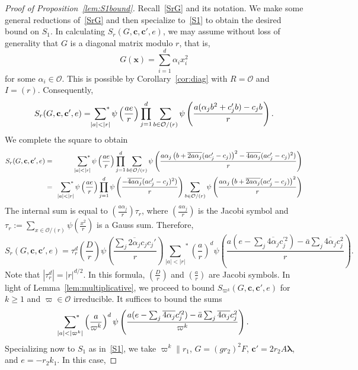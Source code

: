 \documentclass[10pt]{amsart}
\theoremstyle{plain}
\theoremstyle{plain}
\renewcommand{\vec}[1]{\mathbf{#1}}
\theoremstyle{remark}
\theoremstyle{definition}
\newcommand{\sumstar}{\sideset{}{^*}\sum}
\begin{document}
\begin{proof}[Proof of Proposition~\ref{lem:S1bound}]
Recall~\eqref{SrG} and its notation. We make some general reductions of~\eqref{SrG} and then specialize to~\eqref{S1} to obtain the desired bound on $S_1$. In calculating $S_r(G,\vec{c},\vec{c}',e)$, we may assume without loss of generality that $G$ is a diagonal matrix modulo $r$, that is,
\[G(\vec{x})=\sum_{i=1}^d\alpha_ix_i^2\]
for some $\alpha_i\in\mathcal{O}$. This is possible by Corollary~\ref{cor:diag} with $R=\mathcal{O}$ and $I=(r)$. Consequently,
\[S_r(G,\vec{c},\vec{c}',e)=\sumstar_{|a|<|r|} \psi\left(\frac{ae}{r}\right)  \prod_{j=1}^{d} \sum_{b\in\mathcal{O}/(r)} \psi\left(\frac{a(\alpha_jb^2+c_j^{\prime}b)-c_jb}{r} \right).\]
We complete the square to obtain
\begin{eqnarray*}S_r(G,\vec{c},\vec{c}',e)&=&\sumstar_{|a|<|r|} \psi\left(\frac{ae}{r}\right)\prod_{j=1}^{d} \sum_{b\in\mathcal{O}/(r)} \psi\left(\frac{a\alpha_j\left(b+\overline{2a\alpha_j}(ac_j'-c_j)\right)^2-\overline{4a\alpha_j}(ac_j^{\prime}-c_j)^2)}{r}\right)
\\
 &=&\sumstar_{|a|<|r|} \psi\left(\frac{ae}{r}\right)\prod_{j=1}^{d} \psi\left(\frac{-\overline{4a\alpha_j}(ac_j^{\prime}-c_j)^2)}{r}\right)\sum_{b\in\mathcal{O}/(r)} \psi\left(\frac{a\alpha_j\left(b+\overline{2a\alpha_j}(ac_j'-c_j)\right)^2}{r}\right)  \end{eqnarray*}
The internal sum is equal to $\left(\frac{a\alpha_j}{r}\right)\tau_r$, where $\left(\frac{a\alpha_j}{r}\right)$ is the Jacobi symbol and $\tau_r:=\sum_{x\in\mathcal{O}/(r)}\psi\left(\frac{x^2}{r}\right)$ is a Gauss sum. Therefore,
\[S_r(G,\vec{c},\vec{c}',e)=\tau_r^d\left(\frac{D}{r}\right)\psi\left(\frac{\sum_{j}\overline{2\alpha_j}c_jc_j'}{r}\right){\sum_{|a|<|r|}}^* \left(\frac{a}{r} \right)^d \psi\left(\frac{a(e-\sum_{j}\overline{4\alpha_j}c_j^{\prime 2})-\bar{a}\sum_{j}\overline{4\alpha_j}c_j^2}{r}  \right).\]
Note that $|\tau_r^d|=|r|^{d/2}$. In this formula, $\left(\frac{D}{r}\right)$ and $\left(\frac{a}{r} \right)$ are Jacobi symbols. In light of Lemma~\ref{lem:multiplicative}, we proceed to bound $S_{\varpi^k}(G,\vec{c},\vec{c}',e)$ for $k\geq 1$ and $\varpi\in\mathcal{O}$ irreducible. It suffices to bound the sums
\[\sumstar_{|a|<|\varpi^k|} \left(\frac{a}{\varpi^k} \right)^d \psi\left(\frac{a(e-\sum_{j}\overline{4\alpha_j}c_j^{\prime 2})-\bar{a}\sum_{j}\overline{4\alpha_j}c_j^2}{\varpi^k}  \right).\]
Specializing now to $S_1$ as in~\eqref{S1}, we take $\varpi^k\|r_1$, $G=(gr_2)^2F$, $\vec{c}'=2r_2A\boldsymbol{\lambda}$, and $e=-r_2k_1$. In this case,

\end{proof}
\end{document}
